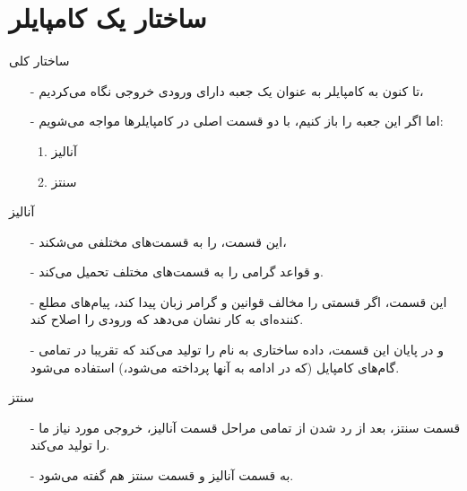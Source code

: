 \section{ساختار یک کامپایلر}
\begin{frame}{ساختار کلی}
\begin{itemize}\itemr
\item[-]
تا کنون به کامپایلر به عنوان یک جعبه دارای ورودی خروجی نگاه می‌کردیم،
\item[-]
اما اگر این جعبه را باز کنیم، با دو قسمت اصلی در کامپایلر‌ها مواجه می‌شویم:
\begin{enumerate}\itemr
\item 
آنالیز
\item 
سنتز
\end{enumerate}
\end{itemize}
\end{frame}

\begin{frame}{آنالیز}
\begin{itemize}\itemr
\item[-]
این قسمت،  را به قسمت‌های مختلفی می‌شکند،

\item[-]
و قواعد گرامی را به قسمت‌های مختلف تحمیل می‌کند.

\item[-]
این قسمت، اگر قسمتی را مخالف قوانین و گرامر زبان پیدا کند، پیام‌های مطلع کننده‌ای به کار نشان می‌دهد که ورودی را اصلاح کند.

\item[-]
و در پایان این قسمت، داده ساختاری به نام  را تولید می‌کند که تقریبا در تمامی گام‌های کامپایل (که در ادامه به آنها پرداخته می‌شود،) استفاده می‌شود.
\end{itemize}
\end{frame}

\begin{frame}{سنتز}
\begin{itemize}\itemr
\item[-]
قسمت سنتز، بعد از رد شدن از تمامی مراحل قسمت آنالیز، خروجی مورد نیاز ما را تولید می‌کند.

\item[-]
به قسمت آنالیز 
و قسمت سنتز
هم گفته می‌شود.
\end{itemize}
\end{frame}

